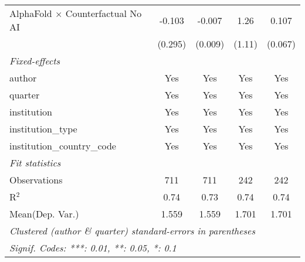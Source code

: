 \begin{tabular}{lcccc}
   AlphaFold $\times$ Counterfactual No AI  & -0.103       & -0.007      & 1.26       & 0.107\\   
                                            & (0.295)      & (0.009)     & (1.11)     & (0.067)\\   
   \midrule
   \emph{Fixed-effects}\\
   author                                   & Yes          & Yes         & Yes        & Yes\\  
   quarter                                  & Yes          & Yes         & Yes        & Yes\\  
   institution                              & Yes          & Yes         & Yes        & Yes\\  
   institution\_type                        & Yes          & Yes         & Yes        & Yes\\  
   institution\_country\_code               & Yes          & Yes         & Yes        & Yes\\  
   \midrule
   \emph{Fit statistics}\\
   Observations                             & 711          & 711         & 242        & 242\\  
   R$^2$                                    & 0.74         & 0.73        & 0.74       & 0.74\\  
Mean(Dep. Var.) & 1.559 & 1.559 & 1.701 & 1.701 \\
   \midrule \midrule
   \multicolumn{5}{l}{\emph{Clustered (author \& quarter) standard-errors in parentheses}}\\
   \multicolumn{5}{l}{\emph{Signif. Codes: ***: 0.01, **: 0.05, *: 0.1}}\\
\end{tabular}
\par\endgroup

